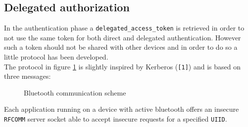 \documentclass[conference]{IEEEtran}
\begin{document}
\subsection{\textbf{Delegated authorization}}
In the authentication phase a \texttt{delegated\allowbreak\_access\allowbreak\_token} is retrieved in order to not use the same token for both direct and delegated authentication. However such a token should not be shared with other devices and in order to do so a little protocol has been developed.\\
The protocol in figure \ref{img:bluetooth} is slightly inspired by Kerberos (\texttt{[1]}) and is based on three messages:\\

\begin{figure}[!ht]
\begin{center}
\caption{Bluetooth communication scheme}
\label{img:bluetooth}
\end{center}
\end{figure}

Each application running on a device with active bluetooth offers an insecure \texttt{RFCOMM} server socket able to accept insecure requests for a specified \texttt{UIID}.\\
\end{document}
